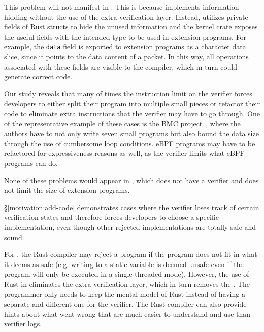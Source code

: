 This problem will not manifest in \projname{}.
This is because \projname{} implements information hidding without the use of
    the extra verification layer.
Instead, \projname{} utilizes private fields of Rust structs to hide the unused
    information and the kernel crate exposes the useful fields with the
    intended type to be used in extension programs.
For example, the \texttt{data} field is exported to extension programs as a
    character data slice, since it points to the data content of a packet.
In this way, all operations associated with these fields are visible to the
    compiler, which in turn could generate correct code.

Our study reveals that many of times the instruction limit on the verifier
    forces developers to either split their program into multiple small pieces
    or refactor their code to eliminate extra instructions that the verifier
    may have to go through.
One of the representative example of these cases is the BMC project~\cite{BMC},
    where the authors have to not only write seven small programs but also
    bound the data size through the use of cumbersome loop conditions.
eBPF programs may have to be refactored for expressiveness reasons as well,
    as the verifier limits what eBPF programs can do.

None of these problems would appear in \projname{}, which does not
    have a verifier and does not limit the size of extension programs.


\S\ref{motivation:add-code} demonstrates cases where the verifier loses track
    of certain verification states and therefore forces developers to
    choose a specific implementation, even though other rejected
    implementations are totally safe and sound.

For \projname{}, the Rust compiler may reject a program if the program does not
    fit in what it deems as safe (e.g. writing to a static variable is deemed
    unsafe even if the program will only be executed in a single threaded
    mode).
However, the use of Rust in \projname{} eliminates the extra verification layer,
    which in turn removes the \gap{}. %
The programmer only needs to keep the mental model of Rust instead of having a
    separate and different one for the verifier.
The Rust compiler can also provide hints about what went wrong that are much
    easier to understand and use than verifier logs.

